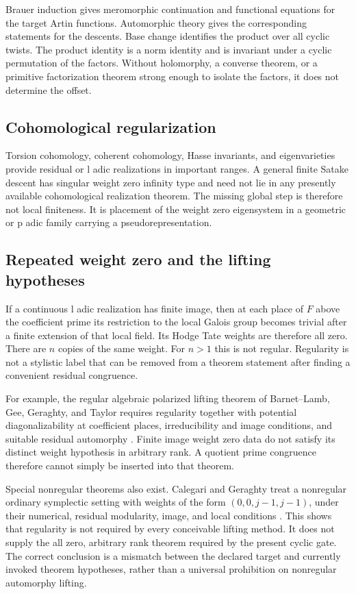 Brauer induction gives meromorphic continuation and functional equations for the target Artin functions. Automorphic theory gives the corresponding statements for the descents. Base change identifies the product over all cyclic twists. The product identity is a norm identity and is invariant under a cyclic permutation of the factors. Without holomorphy, a converse theorem, or a primitive factorization theorem strong enough to isolate the factors, it does not determine the offset.

\subsection{Cohomological regularization}

Torsion cohomology, coherent cohomology, Hasse invariants, and eigenvarieties provide residual or l adic realizations in important ranges. A general finite Satake descent has singular weight zero infinity type and need not lie in any presently available cohomological realization theorem. The missing global step is therefore not local finiteness. It is placement of the weight zero eigensystem in a geometric or p adic family carrying a pseudorepresentation.

\subsection{Repeated weight zero and the lifting hypotheses}

If a continuous l adic realization has finite image, then at each place of \(F\) above the coefficient prime its restriction to the local Galois group becomes trivial after a finite extension of that local field. Its Hodge Tate weights are therefore all zero. There are \(n\) copies of the same weight. For \(n>1\) this is not regular. Regularity is not a stylistic label that can be removed from a theorem statement after finding a convenient residual congruence.

For example, the regular algebraic polarized lifting theorem of Barnet--Lamb, Gee, Geraghty, and Taylor requires regularity together with potential diagonalizability at coefficient places, irreducibility and image conditions, and suitable residual automorphy \cite{BLGGT2014}. Finite image weight zero data do not satisfy its distinct weight hypothesis in arbitrary rank. A quotient prime congruence therefore cannot simply be inserted into that theorem.

Special nonregular theorems also exist. Calegari and Geraghty treat a nonregular ordinary symplectic setting with weights of the form \((0,0,j-1,j-1)\), under their numerical, residual modularity, image, and local conditions \cite{CalegariGeraghty2020}. This shows that regularity is not required by every conceivable lifting method. It does not supply the all zero, arbitrary rank theorem required by the present cyclic gate. The correct conclusion is a mismatch between the declared target and currently invoked theorem hypotheses, rather than a universal prohibition on nonregular automorphy lifting.

